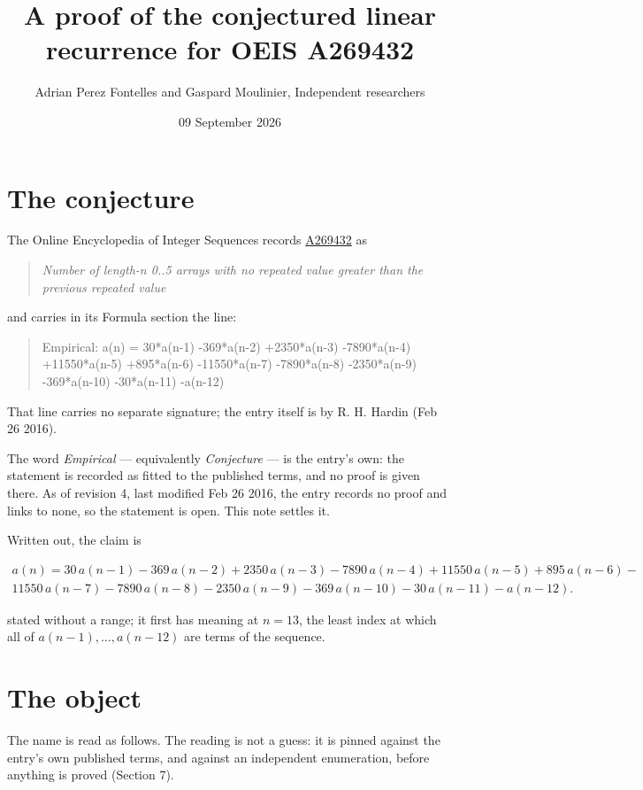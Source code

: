 \documentclass[11pt]{article}
\title{A proof of the conjectured linear recurrence for OEIS A269432}
\author{Adrian Perez Fontelles and Gaspard Moulinier, Independent researchers}
\date{09 September 2026}
\theoremstyle{definition}
\begin{document}
\maketitle
\section{The conjecture}

The Online Encyclopedia of Integer Sequences records \href{https://oeis.org/A269432}{A269432} as

\begin{quote}\itshape Number of length-n 0..5 arrays with no repeated value greater than the previous repeated value\end{quote}

and carries in its Formula section the line:

\begin{quote}\ttfamily Empirical: a(n) = 30*a(n-1) -369*a(n-2) +2350*a(n-3) -7890*a(n-4) +11550*a(n-5) +895*a(n-6) -11550*a(n-7) -7890*a(n-8) -2350*a(n-9) -369*a(n-10) -30*a(n-11) -a(n-12)\end{quote}

That line carries no separate signature; the entry itself is by R. H. Hardin (Feb 26 2016).

The word {\itshape Empirical} --- equivalently {\itshape Conjecture} --- is the entry's own: the statement is recorded as fitted to the published terms, and no proof is given there. As of revision 4, last modified Feb 26 2016, the entry records no proof and links to none, so the statement is open. This note settles it.

Written out, the claim is

\begin{multline*} a(n) = 30\,a(n-1) - 369\,a(n-2) + 2350\,a(n-3) - 7890\,a(n-4) + 11550\,a(n-5) + 895\,a(n-6) - \\ 11550\,a(n-7) - 7890\,a(n-8) - 2350\,a(n-9) - 369\,a(n-10) - 30\,a(n-11) - a(n-12). \end{multline*}

stated without a range; it first has meaning at $n = 13$, the least index at which all of $a(n-1),\dots,a(n-12)$ are terms of the sequence.

\section{The object}

The name is read as follows. The reading is not a guess: it is pinned against the entry's own published terms, and against an independent enumeration, before anything is proved (Section 7).
\end{document}
